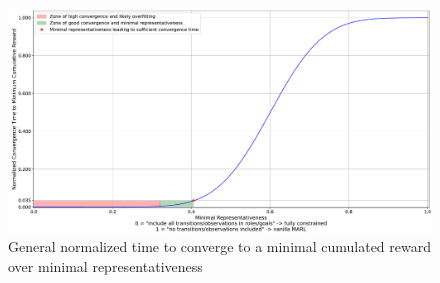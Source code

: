 \documentclass[pdflatex,sn-mathphys-num]{sn-jnl}%
\theoremstyle{thmstyleone}%
\theoremstyle{thmstyletwo}%
\theoremstyle{thmstylethree}%
\begin{document}
\begin{figure}[h!]
    \centering
    \includegraphics[trim=0cm 0cm 0cm 0cm, clip, width=1.\linewidth]{figures/convergence_time_relative_to_representativeness.pdf}
    \caption{General normalized time to converge to a minimal cumulated reward over minimal representativeness}
    \label{fig:conv_time_repr}
\end{figure}
\end{document}
